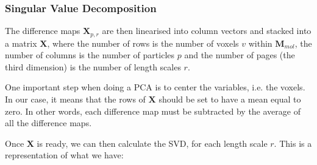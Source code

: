 \subsubsection{Singular Value Decomposition} \label{sec:algo:classification:SVD}

The difference maps $\bm{X}_{p,r}$ are then linearised into column vectors and stacked into a matrix $\bm{X}$, where the number of rows is the number of voxels $v$ within $\bm{M}_{mol}$, the number of columns is the number of particles $p$ and the number of pages (the third dimension) is the number of length scales $r$.

One important step when doing a PCA is to center the variables, i.e. the voxels. In our case, it means that the rows of $\bm{X}$ should be set to have a mean equal to zero. In other words, each difference map must be subtracted by the average of all the difference maps.

Once $\bm{X}$ is ready, we can then calculate the SVD, for each length scale $r$. This is a representation of what we have:



